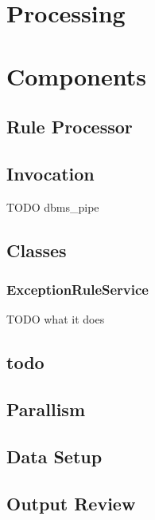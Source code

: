 \chapter{Processing}
\chapter{Components}
\section{Rule Processor}
\section{Invocation}
TODO dbms_pipe
\section{Classes}
\subsection{ExceptionRuleService}
TODO what it does

\section{todo}
\section{Parallism}
\section{Data Setup}
\section{Output Review}
